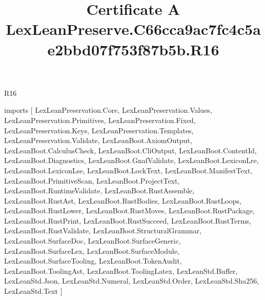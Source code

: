\begin{lexlean}{R16}
\title{Certificate A LexLeanPreserve.C66cca9ac7fc4c5ae2bbd07f753f87b5b.R16}
\begin{coremodule}
imports [
  LexLeanPreservation.Core,
  LexLeanPreservation.Values,
  LexLeanPreservation.Primitives,
  LexLeanPreservation.Fixed,
  LexLeanPreservation.Keys,
  LexLeanPreservation.Templates,
  LexLeanPreservation.Validate,
  LexLeanBoot.AxiomOutput,
  LexLeanBoot.CalculusCheck,
  LexLeanBoot.CliOutput,
  LexLeanBoot.ContentId,
  LexLeanBoot.Diagnostics,
  LexLeanBoot.GnafValidate,
  LexLeanBoot.LexiconLre,
  LexLeanBoot.LexiconLse,
  LexLeanBoot.LockText,
  LexLeanBoot.ManifestText,
  LexLeanBoot.PrimitiveScan,
  LexLeanBoot.ProjectText,
  LexLeanBoot.RuntimeValidate,
  LexLeanBoot.RustAssemble,
  LexLeanBoot.RustAst,
  LexLeanBoot.RustBodies,
  LexLeanBoot.RustLoops,
  LexLeanBoot.RustLower,
  LexLeanBoot.RustMoves,
  LexLeanBoot.RustPackage,
  LexLeanBoot.RustPrint,
  LexLeanBoot.RustSucceed,
  LexLeanBoot.RustTerms,
  LexLeanBoot.RustValidate,
  LexLeanBoot.StructuralGrammar,
  LexLeanBoot.SurfaceDoc,
  LexLeanBoot.SurfaceGeneric,
  LexLeanBoot.SurfaceLex,
  LexLeanBoot.SurfaceModule,
  LexLeanBoot.SurfaceTooling,
  LexLeanBoot.TokenAudit,
  LexLeanBoot.ToolingAst,
  LexLeanBoot.ToolingLatex,
  LexLeanStd.Buffer,
  LexLeanStd.Json,
  LexLeanStd.Numeral,
  LexLeanStd.Order,
  LexLeanStd.Sha256,
  LexLeanStd.Text
]


\end{coremodule}
\end{lexlean}
